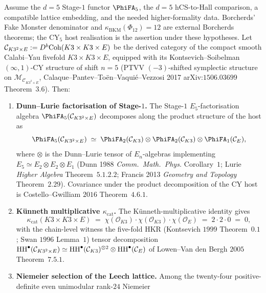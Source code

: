 \begin{theorem}[Fake Monster placement at \texorpdfstring{$d = 5$}{d = 5}: Dunn--Lurie factorisation, Niemeier selection, modular-operadic supertrace]
\label{thm:cy-c-beyond-chain-level-fake-monster-d5}
Assume the $d=5$ Stage-$1$ functor $\PhiFA_5$, the $d=5$
hCS-to-Hall comparison, a compatible lattice embedding, and the
needed higher-formality data. Borcherds' Fake Monster denominator
and $\kappa_{\mathrm{BKM}}(\Phi_{12})=12$ are external Borcherds
theorems; the CY$_5$ host realisation is the assertion under these
hypotheses. Let
$\mathcal C_{K3^2 \times E} := D^b\mathrm{Coh}(K3 \times K3 \times E)$ be
the derived category of the compact smooth Calabi--Yau fivefold
$K3 \times K3 \times E$, equipped with its Kontsevich--Soibelman
$(\infty, 1)$-CY structure of shift $n = 5$
(PTVV $(-3)$-shifted symplectic structure on $\mathcal M_{\mathcal
C_{K3^2 \times E}}$, Calaque--Pantev--To\"en--Vaqui\'e--Vezzosi 2017
arXiv:$1506.03699$ Theorem~$3.6$). Then:
\begin{enumerate}[label=\textup{(\roman*)}]
\item \textbf{Dunn--Lurie factorisation of Stage-$1$.} The Stage-$1$
$E_5$-factorisation algebra $\PhiFA_5(\mathcal C_{K3^2 \times E})$
decomposes along the product structure of the host as
\[
 \PhiFA_5(\mathcal C_{K3^2 \times E})
 \;\simeq\;
 \PhiFA_2(\mathcal C_{K3}) \otimes \PhiFA_2(\mathcal C_{K3}) \otimes
 \PhiFA_1(\mathcal C_E),
\]
where $\otimes$ is the Dunn--Lurie tensor of $E_n$-algebras implementing
$E_5 \simeq E_2 \otimes E_2 \otimes E_1$ (Dunn 1988 \emph{Comm.\ Math.\
Phys.} Corollary~$1$; Lurie \emph{Higher Algebra} Theorem~$5.1.2.2$;
Francis 2013 \emph{Geometry and Topology} Theorem~$2.29$). Covariance
under the product decomposition of the CY host is Costello--Gwilliam
$2016$ Theorem~$4.6.1$.
\item \textbf{K\"unneth multiplicative $\kappa_{\mathrm{cat}}$.} The
K\"unneth-multiplicative identity gives
\[
 \kappa_{\mathrm{cat}}(K3 \times K3 \times E)
 \;=\;
 \chi(\mathcal O_{K3}) \cdot \chi(\mathcal O_{K3}) \cdot \chi(\mathcal O_E)
 \;=\;
 2 \cdot 2 \cdot 0
 \;=\;
 0,
\]
with the chain-level witness the five-fold HKR
(Kontsevich $1999$ Theorem~$0.1$; Swan $1996$ Lemma~$1$) tensor
decomposition
$\mathrm{HH}^\bullet(\mathcal C_{K3^2 \times E}) \simeq
\mathrm{HH}^\bullet(\mathcal C_{K3})^{\otimes 2} \otimes \mathrm{HH}^\bullet(\mathcal
C_E)$ of Lowen--Van den Bergh $2005$ Theorem~$7.5.1$.
\item \textbf{Niemeier selection of the Leech lattice.} Among the
twenty-four positive-definite even unimodular rank-$24$ Niemeier

\end{enumerate}
\end{theorem}
